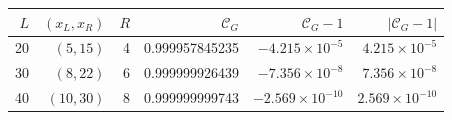 \begin{tabular}{rrrrrr}
\toprule
$L$ & $(x_L,x_R)$ & $R$ & $\mathcal C_G$ & $\mathcal C_G-1$ & $|\mathcal C_G-1|$ \\
\midrule
20 & $(5,15)$ & 4 & 0.999957845235 & $-4.215\times10^{-5}$ & $4.215\times10^{-5}$ \\
30 & $(8,22)$ & 6 & 0.999999926439 & $-7.356\times10^{-8}$ & $7.356\times10^{-8}$ \\
40 & $(10,30)$ & 8 & 0.999999999743 & $-2.569\times10^{-10}$ & $2.569\times10^{-10}$ \\
\bottomrule
\end{tabular}
